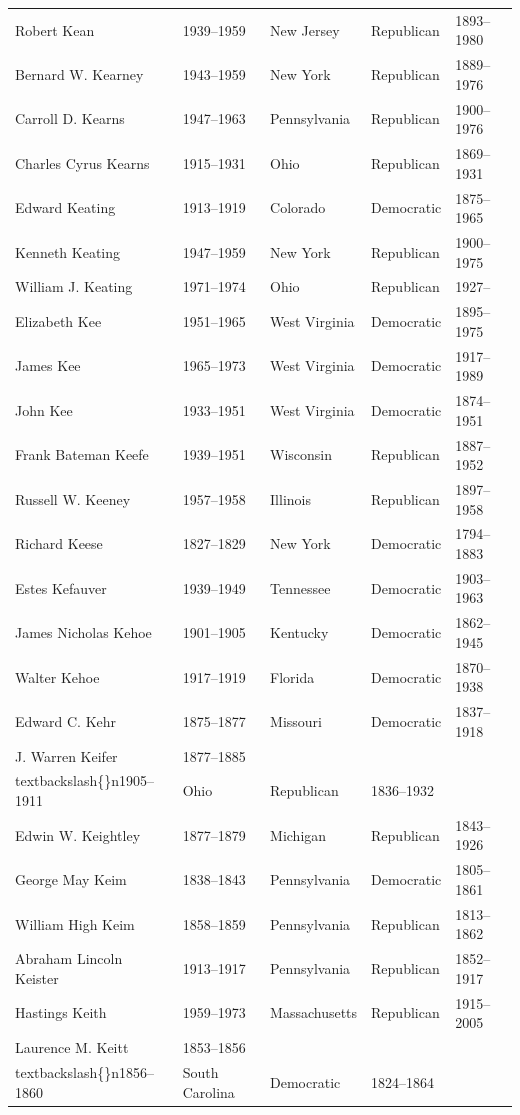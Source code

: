\documentclass{article}
\begin{document}
\begin{tabular}{lllll}
Robert Kean & 1939–1959 & New Jersey & Republican & 1893–1980 \\
Bernard W. Kearney & 1943–1959 & New York & Republican & 1889–1976 \\
Carroll D. Kearns & 1947–1963 & Pennsylvania & Republican & 1900–1976 \\
Charles Cyrus Kearns & 1915–1931 & Ohio & Republican & 1869–1931 \\
Edward Keating & 1913–1919 & Colorado & Democratic & 1875–1965 \\
Kenneth Keating & 1947–1959 & New York & Republican & 1900–1975 \\
William J. Keating & 1971–1974 & Ohio & Republican & 1927– \\
Elizabeth Kee & 1951–1965 & West Virginia & Democratic & 1895–1975 \\
James Kee & 1965–1973 & West Virginia & Democratic & 1917–1989 \\
John Kee & 1933–1951 & West Virginia & Democratic & 1874–1951 \\
Frank Bateman Keefe & 1939–1951 & Wisconsin & Republican & 1887–1952 \\
Russell W. Keeney & 1957–1958 & Illinois & Republican & 1897–1958 \\
Richard Keese & 1827–1829 & New York & Democratic & 1794–1883 \\
Estes Kefauver & 1939–1949 & Tennessee & Democratic & 1903–1963 \\
James Nicholas Kehoe & 1901–1905 & Kentucky & Democratic & 1862–1945 \\
Walter Kehoe & 1917–1919 & Florida & Democratic & 1870–1938 \\
Edward C. Kehr & 1875–1877 & Missouri & Democratic & 1837–1918 \\
J. Warren Keifer & 1877–1885\\textbackslash\{\}n1905–1911 & Ohio & Republican & 1836–1932 \\
Edwin W. Keightley & 1877–1879 & Michigan & Republican & 1843–1926 \\
George May Keim & 1838–1843 & Pennsylvania & Democratic & 1805–1861 \\
William High Keim & 1858–1859 & Pennsylvania & Republican & 1813–1862 \\
Abraham Lincoln Keister & 1913–1917 & Pennsylvania & Republican & 1852–1917 \\
Hastings Keith & 1959–1973 & Massachusetts & Republican & 1915–2005 \\
Laurence M. Keitt & 1853–1856\\textbackslash\{\}n1856–1860 & South Carolina & Democratic & 1824–1864 \\

\end{tabular}
\end{document}
